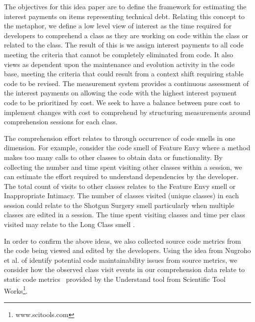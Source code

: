 The objectives for this idea paper are to define the framework for estimating the interest payments on items representing technical debt.  Relating this concept to the \TD  metaphor, we define a low level view of interest as the time required for developers to comprehend a class as they are working on code within the class or related to the class.   The result of this is we assign interest payments to all code meeting the criteria that \TD cannot be completely eliminated from code.  It also views \TD as dependent upon the maintenance and evolution activity in the code base, meeting the criteria that \TD could result from a context shift requiring stable code to be revised. The measurement system provides a continuous assessment of the interest payments on \TD allowing the code with the highest interest payment code to be prioritized by cost.  We seek to have a balance between pure cost to implement changes with cost to comprehend by structuring measurements around comprehension sessions for each class.

The comprehension effort relates to \TD through occurrence of code smells in one dimension.  For example, consider the code smell of Feature Envy  where a method makes too many calls to other classes to obtain data or functionality.  By collecting the number and time spent visiting other classes within a session, we can estimate the effort required to understand dependencies by the developer.  The total count of visits to other classes relates to the Feature Envy smell or Inappropriate Intimacy.  The number of classes visited (unique classes) in each session could  relate to the Shotgun Surgery smell particularly when multiple classes are edited in a session.  The time spent visiting classes and time per class visited may relate to the Long Class smell \cite{Fowler_etal:1999}.  

In order to confirm the above ideas, we also collected source code metrics from the code being viewed and edited by the developers.  Using the idea from Nugroho et al. of identify potential code maintainability issues from source metrics, we consider how the observed class visit events in our comprehension data relate to static code metrics~\cite{Nugroho2011Empirical} provided by the Understand tool from Scientific Tool Works\footnote{www.scitools.com}.  




